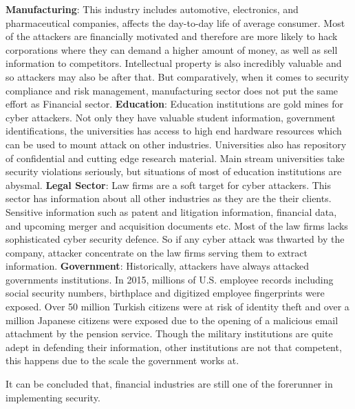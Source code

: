 \documentclass{article}
\begin{document}
\newline \newline \textbf{Manufacturing}: This industry includes automotive, electronics, and pharmaceutical companies, affects the day-to-day life of average consumer. Most of the attackers are financially motivated and therefore are more likely to hack corporations where they can demand a higher amount of money, as well as sell information to competitors. Intellectual property is also incredibly valuable and so attackers may also be after that. But comparatively, when it comes to security compliance and risk management, manufacturing sector does not put the same effort as Financial sector.
\newline \newline \textbf{Education}: Education institutions are gold mines for cyber attackers. Not only they have valuable student information, government identifications, the universities has access to high end hardware resources which can be used to mount attack on other industries. Universities also has repository of confidential and cutting edge research material. Main stream universities take security violations seriously, but situations of most of education institutions are abysmal.
\newline \newline \textbf{Legal Sector}: Law firms are a soft target for cyber attackers. This sector has information about all other industries as they are the their clients. Sensitive information such as patent and litigation information, financial data, and upcoming merger and acquisition documents etc. Most of the law firms lacks sophisticated cyber security defence. So if any cyber attack was thwarted by the company, attacker concentrate on the law firms serving them to extract information.
\newline \newline \textbf{Government}: Historically, attackers have always attacked governments institutions. In 2015, millions of U.S. employee records including social security numbers, birthplace and digitized employee fingerprints were exposed. Over 50 million Turkish citizens were at risk of identity theft and over a million Japanese citizens were exposed due to the opening of a malicious email attachment by the pension service. Though the military institutions are quite adept in defending their information, other institutions are not that competent, this happens due to the scale the government works at.

It can be concluded that, financial industries are still one of the forerunner in implementing security.


\nocite{globsi}
\nocite{compsec_wl}


\end{document}
